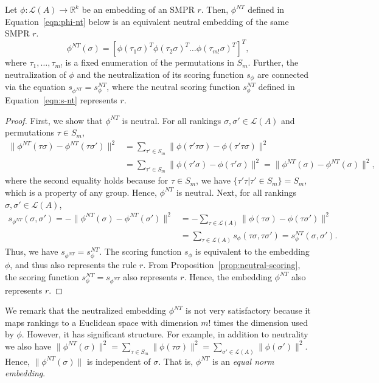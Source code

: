 \documentclass[prodmode,acmec]{ec-acmsmall}
\newcommand{\calL}{{\mathcal{L}}}
\newcommand{\rank}{{\calL(A)}}
\newcommand{\nt}{NT}
\begin{document}
\begin{lemma}
Let $\phi: \rank \to \mathbb{R}^k$ be an embedding of an SMPR $r$. Then, $\phi^{\nt}$ defined in Equation~\eqref{eqn:phi-nt} below is an equivalent neutral embedding of the same SMPR $r$. 
\begin{equation}
\phi^{\nt}(\sigma) = [\phi(\tau_1 \sigma)^T \phi(\tau_2 \sigma)^T \ldots \phi(\tau_{m!} \sigma)^T]^T,
\label{eqn:phi-nt}
\end{equation}
where $\tau_1,\ldots,\tau_{m!}$ is a fixed enumeration of the permutations in $S_m$. Further, the neutralization of $\phi$ and the neutralization of its scoring function $s_{\phi}$ are connected via the equation $s_{\phi^{\nt}} = s ^{\nt}_{\phi}$, where the neutral scoring function $s ^{\nt}_{\phi}$ defined in Equation~\eqref{eqn:s-nt} represents $r$. 
\label{lem:neutral-embedding}
\end{lemma}
\begin{proof}
First, we show that $\phi^{\nt}$ is neutral. For all rankings $\sigma,\sigma' \in \rank$ and permutations $\tau \in S_m$, 
\begin{align*}
\|\phi^{\nt}(\tau \sigma)-\phi^{\nt}(\tau \sigma')\|^2 &= \sum_{\tau' \in S_m} \|\phi(\tau' \tau \sigma)-\phi(\tau' \tau \sigma)\|^2 \\
&= \sum_{\tau' \in S_m} \|\phi(\tau' \sigma)-\phi(\tau' \sigma)\|^2 = \|\phi^{\nt}(\sigma)-\phi^{\nt}(\sigma)\|^2,
\end{align*}
where the second equality holds because for $\tau \in S_m$, we have $\{\tau' \tau | \tau' \in S_m\} = S_m$, which is a property of any group. Hence, $\phi^{\nt}$ is neutral. Next, for all rankings $\sigma,\sigma' \in \rank$, 
\begin{align*}
s_{\phi^{\nt}}(\sigma,\sigma') = -\|\phi^{\nt}(\sigma)-\phi^{\nt}(\sigma')\|^2 &= - \sum_{\tau \in \rank} \|\phi(\tau \sigma)-\phi(\tau \sigma')\|^2  \\
&= \sum_{\tau \in \rank} s_{\phi}(\tau \sigma,\tau \sigma') = s_{\phi}^{\nt}(\sigma,\sigma').
\end{align*}
Thus, we have $s_{\phi^{\nt}} = s_{\phi}^{\nt}$. The scoring function $s_{\phi}$ is equivalent to the embedding $\phi$, and thus also represents the rule $r$. From Proposition~\ref{prop:neutral-scoring}, the scoring function $s_{\phi}^{\nt} = s_{\phi^{\nt}}$ also represents $r$. Hence, the embedding $\phi^{\nt}$ also represents $r$. 
\end{proof}

We remark that the neutralized embedding $\phi^{\nt}$ is not very satisfactory because it maps rankings to a Euclidean space with dimension $m!$ times the dimension used by $\phi$. However, it has significant structure. For example, in addition to neutrality we also have $\|\phi^{\nt}(\sigma)\|^2 = \sum_{\tau \in S_m} \|\phi(\tau \sigma)\|^2 = \sum_{\sigma' \in \rank} \|\phi(\sigma')\|^2$. 
Hence, $\|\phi^{\nt}(\sigma)\|$ is independent of $\sigma$. That is, $\phi^{\nt}$ is an \emph{equal norm embedding}.
\end{document}
